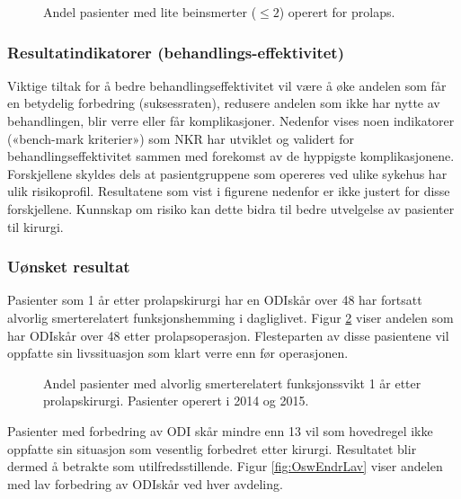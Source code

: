 \documentclass [norsk,a4paper,twoside]{article}\usepackage[]{graphicx}\usepackage[]{color}
\begin{document}
\begin{figure}[ht]
\caption{\label{fig:BeinsmLavPre}  Andel pasienter med lite beinsmerter ($\leq 2$) operert for prolaps.}
\end{figure}






\subsubsection{Resultatindikatorer (behandlings-effektivitet)}

Viktige tiltak for å bedre behandlingseffektivitet vil være å øke andelen som får en
betydelig forbedring (suksessraten), redusere andelen som ikke har nytte av
behandlingen, blir verre eller får komplikasjoner. Nedenfor vises noen indikatorer
(«bench-mark kriterier») som NKR har utviklet og validert for
behandlingseffektivitet sammen med forekomst av de hyppigste komplikasjonene.
Forskjellene skyldes dels at pasientgruppene som opereres ved ulike sykehus har
ulik risikoprofil. Resultatene som vist i figurene nedenfor er ikke justert for disse
forskjellene. Kunnskap om risiko kan dette bidra til bedre utvelgelse av pasienter til
kirurgi.





\subsubsection{Uønsket resultat}

Pasienter som 1 år etter prolapskirurgi har en ODIskår over 48 har fortsatt alvorlig
smerterelatert funksjonshemming i dagliglivet. Figur \ref{fig:Osw48} viser andelen som har ODIskår over 48 etter prolapsoperasjon. Flesteparten av disse pasientene vil
oppfatte sin livssituasjon som klart verre enn før operasjonen. 

\begin{figure}[ht]
\caption{\label{fig:Osw48}  Andel pasienter med alvorlig smerterelatert funksjonssvikt 1 år etter
prolapskirurgi. Pasienter operert i 2014 og 2015.}
\end{figure}



Pasienter med forbedring av ODI skår mindre enn 13 vil som hovedregel ikke
oppfatte sin situasjon som vesentlig forbedret etter kirurgi. Resultatet blir dermed å
betrakte som utilfredsstillende. Figur \ref{fig:OswEndrLav} viser andelen med lav forbedring av ODIskår ved hver avdeling.
\end{document}
